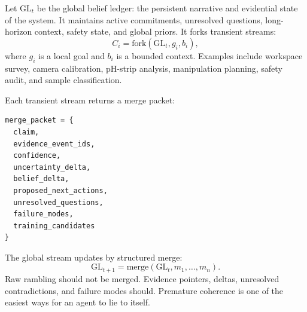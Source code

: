 \documentclass[11pt]{article}
\newcommand{\GL}{\mathrm{GL}}
\begin{document}
Let $\GL_t$ be the global belief ledger: the persistent narrative and evidential state of the system. It maintains active commitments, unresolved questions, long-horizon context, safety state, and global priors. It forks transient streams:
\begin{equation}
  C_i=\mathrm{fork}(\GL_t,g_i,b_i),
\end{equation}
where $g_i$ is a local goal and $b_i$ is a bounded context. Examples include workspace survey, camera calibration, pH-strip analysis, manipulation planning, safety audit, and sample classification.

Each transient stream returns a merge packet:
\begin{lstlisting}
merge_packet = {
  claim,
  evidence_event_ids,
  confidence,
  uncertainty_delta,
  belief_delta,
  proposed_next_actions,
  unresolved_questions,
  failure_modes,
  training_candidates
}
\end{lstlisting}

The global stream updates by structured merge:
\begin{equation}
  \GL_{t+1}=\mathrm{merge}(\GL_t,m_1,\ldots,m_n).
\end{equation}
Raw rambling should not be merged. Evidence pointers, deltas, unresolved contradictions, and failure modes should. Premature coherence is one of the easiest ways for an agent to lie to itself.
\end{document}
